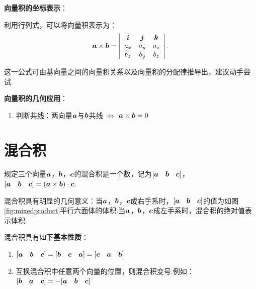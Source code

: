 \par \textbf{向量积的坐标表示}：
\par 利用行列式，可以将向量积表示为：
\begin{equation}
  \vb*{a} \times \vb*{b}=
  \left |\begin{array}{ccc}
    \vb*{i} & \vb*{j} & \vb*{k} \\
    a_x     & a_y     & a_z     \\
    b_x     & b_y     & b_z     \\
  \end{array}\right |.
\end{equation}
\par 这一公式可由基向量之间的向量积关系以及向量积的分配律推导出，建议动手尝试.

\par \textbf{向量积的几何应用}：
\begin{enumerate}
  \item 判断共线：两向量$\vb*{a}$与$\vb*{b}$共线 $\Leftrightarrow$ $\vb*{a} \times \vb*{b}=0$
\end{enumerate}

\section{混合积}
\begin{definition}[混合积]
  规定三个向量$\vb*{a}$，$\vb*{b}$，$\vb*{c}$的混合积是一个数，记为$[\vb*{a} \quad \vb*{b} \quad \vb*{c}]$，$[\vb*{a} \quad \vb*{b} \quad \vb*{c}]=(\vb*{a} \times \vb*{b}) \cdot \vb*{c}$.
\end{definition}
\par 混合积具有明显的几何意义：当$\vb*{a}$，$\vb*{b}$，$\vb*{c}$成右手系时，$[\vb*{a} \quad \vb*{b} \quad \vb*{c}]$的值为如图\ref{fig:mixedproduct}平行六面体的体积.当$\vb*{a}$，$\vb*{b}$，$\vb*{c}$成左手系时，混合积的绝对值表示体积.

\par 混合积具有如下\textbf{基本性质}：
\begin{enumerate}
  \item $[\vb*{a} \quad \vb*{b} \quad \vb*{c}]=[\vb*{b} \quad \vb*{c} \quad \vb*{a}]=[\vb*{c} \quad \vb*{a} \quad \vb*{b}]$
  \item 互换混合积中任意两个向量的位置，则混合积变号.例如：$[\vb*{b} \quad \vb*{a} \quad \vb*{c}]=-[\vb*{a} \quad \vb*{b} \quad \vb*{c}]$
\end{enumerate}

